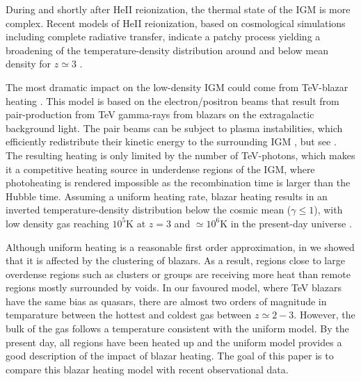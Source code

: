 \documentclass[numberedappendix]{emulateapj}
\begin{document}
During  and shortly after HeII reionization, the thermal state of the IGM is more complex.  Recent models of HeII reionization, based on cosmological simulations including complete radiative transfer, indicate a patchy process yielding a broadening of the temperature-density distribution around and below mean density for $z\simeq 3$ \citep{2009ApJ...694..842M,2012MNRAS.423....7M,2013MNRAS.435.3169C}. 

 
The most dramatic impact on the low-density IGM could come from TeV-blazar heating \citep{2012ApJ...752...23C,2012MNRAS.423..149P,2015ApJ...811...19L}. This model is based on the electron/positron beams that result from pair-production from TeV gamma-rays from blazars on the extragalactic background light. The pair beams can be subject to plasma instabilities, which efficiently redistribute their kinetic energy to the surrounding IGM \citep{2012ApJ...752...22B,2013ApJ...777...49S,2012ApJ...758..102S,2014ApJ...797..110C,2016ApJ...833..118C},  but see \citet{2013ApJ...770...54M,2014ApJ...787...49S}.  The resulting heating is only limited by the number of TeV-photons, which makes it a competitive heating source in  underdense regions of the IGM, where photoheating is rendered impossible as the recombination time is larger than the Hubble time.  Assuming a uniform heating rate, blazar heating results in an inverted temperature-density distribution below the cosmic mean ($\gamma \leq 1$), with low density gas reaching  $10^5$K at $z=3$ and $\simeq 10^6$K in the present-day universe \citep{2012MNRAS.423..149P}.  




Although uniform heating is a reasonable first order approximation, in \citet[hereafter Paper~I]{2015ApJ...811...19L} we showed that it is affected by the clustering of blazars. As a result, regions close to large overdense regions such as clusters or groups are receiving more heat than remote regions mostly surrounded by voids.  In our favoured model, where TeV blazars have the same bias as quasars, there are almost two orders of magnitude in temparature between the hottest and coldest gas between $z\simeq 2-3$. However, the bulk of the gas follows a temperature consistent with the uniform model. By the present day, all regions have been heated up and the uniform model provides a good description of the impact of blazar heating. The goal of this paper is to compare this blazar heating model with recent observational data.
\end{document}

